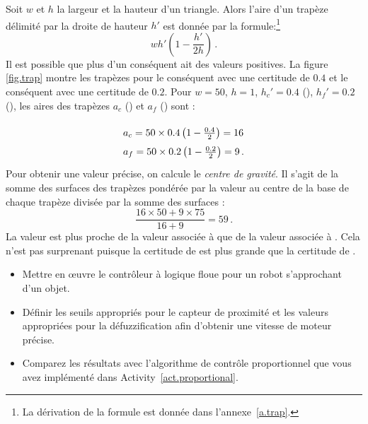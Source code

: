 Soit $w$ et $h$ la largeur et la hauteur d'un triangle. Alors l'aire d'un trapèze délimité par la droite de hauteur $h'$ est donnée par la formule:\footnote{La dérivation de la formule est donnée dans l'annexe~\ref{a.trap}.}
\begin{displaymath}
wh'\left(1-\frac{h'}{2h}\right)\,.
\end{displaymath}
Il est possible que plus d'un conséquent ait des valeurs positives. La figure \ref{fig.trap} montre les trapèzes pour le conséquent  avec une certitude de $0.4$ et le conséquent  avec une certitude de $0.2$. Pour $w=50$, $h=1$, $h_{c}'=0.4$ (), $h_{f}'=0.2$ (), les aires des trapèzes $a_c$ () et $a_f$ () sont :

\begin{displaymath}
\spacearray
\begin{array}{l}
a_c = 50\times 0.4 \left(1 - \frac{0.4}{2}\right) = 16\\
a_f = 50\times 0.2 \left(1 - \frac{0.2}{2}\right) = 9\,.
\end{array}
\end{displaymath}
Pour obtenir une valeur précise, on calcule le \emph{centre de gravité}. Il s'agit de la somme des surfaces des trapèzes pondérée par la valeur au centre de la base de chaque trapèze divisée par la somme des surfaces :
\begin{displaymath}
\frac{16\times 50 + 9\times 75}{16+9}=59\,.
\end{displaymath}
La valeur est plus proche de la valeur associée à  que de la valeur associée à . Cela n'est pas surprenant puisque la certitude de  est plus grande que la certitude de .

\begin{framed}
\begin{itemize}
\item Mettre en œuvre le contrôleur à logique floue pour un robot s'approchant d'un objet.
\item Définir les seuils appropriés pour le capteur de proximité et les valeurs appropriées pour la défuzzification afin d'obtenir une vitesse de moteur précise.
\item Comparez les résultats avec l'algorithme de contrôle proportionnel que vous avez implémenté dans Activity~\ref{act.proportional}.
\end{itemize}
\end{framed}

